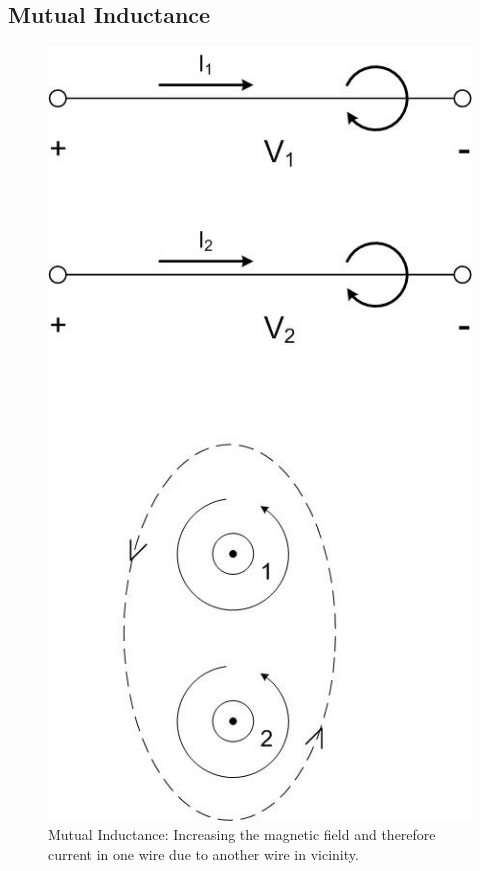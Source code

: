 \documentclass{ximera}
\begin{document}
\subsection{Mutual Inductance}


\begin{figure}[htbp]
\begin{center}
\includegraphics[scale=0.5]{../jpg/increaseinflux.jpg}
\end{center}
\caption{Mutual Inductance: Increasing the magnetic field and therefore current in one wire due to another wire in vicinity. }
\label{MutualInduc}
\end{figure}
\end{document}
